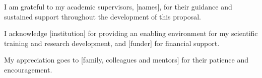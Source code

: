 

I am grateful to my academic supervisors, [names], for their guidance and sustained support throughout the development of this proposal.

I acknowledge [institution] for providing an enabling environment for my scientific training and research development, and [funder] for financial support.

My appreciation goes to [family, colleagues and mentors] for their patience and encouragement.
